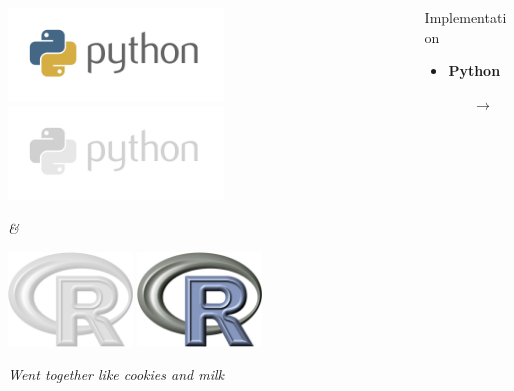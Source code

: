 \documentclass[serif]{beamer}
\begin{document}
	\begin{frame}
	
	\begin{columns}
		\begin{column}{2.4in}
			
			\vspace{0.25in}
			\begin{center}
				\raggedleft
				{
					\includegraphics[width=2.25in]{images/python_logo}
				}
				\only<4-9>
				{
					\includegraphics[width=2.25in]{images/python_logo_dimmed}
				}
			\end{center}
			\begin{center}
				\emph{\Huge \&}
			\end{center}
			\begin{center}
				\raggedright
				{
					\includegraphics[width=1.300in]{images/R_logo_dimmed}	
				}
				\only<4-9>
				{
					\includegraphics[width=1.300in]{images/R_logo}	
				}
			\end{center}
			\begin{center}
				\emph{Went together like cookies and milk}
			\end{center}
			
		\end{column}
		\begin{column}{1.6in}	
			\begin{exampleblock}{Implementation}
				\begin{itemize}
					\item
					{
						{
							\textbf{Python}
						}
						\begin{itemize}
							\item[$\rightarrow$]
							{
							
}
\end{itemize}}
\end{itemize}
\end{exampleblock}
\end{column}
\end{columns}
\end{frame}
\end{document}
